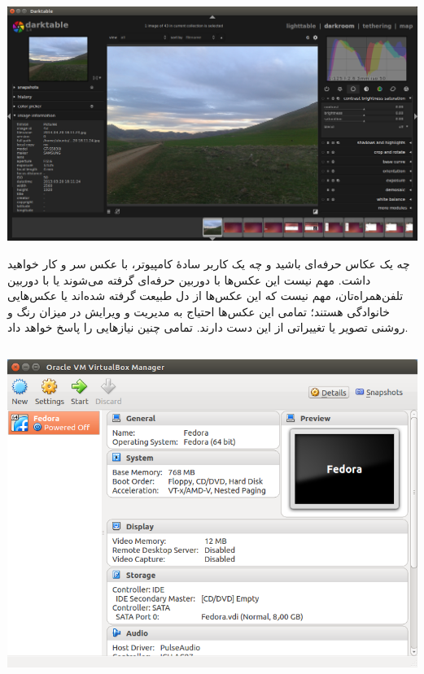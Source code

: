 \subsection[Darktable]{}

\begin{center}
\includegraphics[scale=0.3]{pics/45.png}
\end{center}

چه یک عکاس حرفه‌ای باشید و چه یک کاربر سادهٔ کامپیوتر، با عکس سر و کار خواهید داشت. مهم نیست این عکس‌ها با دوربین حرفه‌ای گرفته می‌شوند یا با دوربین تلفن‌همراه‌تان، مهم نیست که این عکس‌ها از دل طبیعت گرفته شده‌اند یا عکس‌هایی خانوادگی هستند؛ تمامی این عکس‌ها احتیاج به مدیریت و ویرایش در میزان رنگ و روشنی تصویر یا تغییراتی از این دست دارند.  تمامی چنین نیازهایی را پاسخ خواهد داد.

\subsection[Virtualbox]{}

\begin{center}
\includegraphics[scale=0.4]{pics/46.png}
\end{center}

